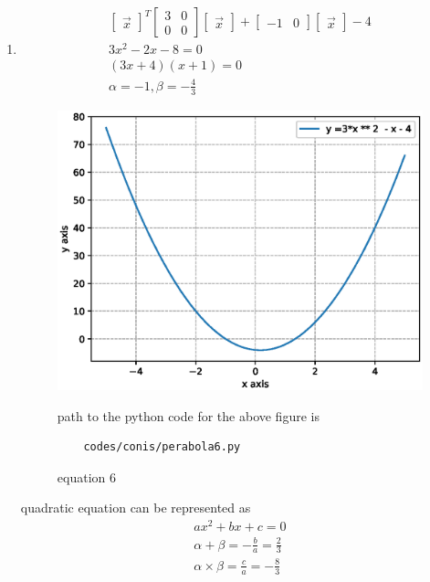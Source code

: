 \begin{enumerate}[label=\arabic*.,ref=\thesubsection.\theenumi]
\item
\begin{align}
\begin{bmatrix}\vec x\end{bmatrix}^T\begin{bmatrix}3 & 0\\0 & 0\end{bmatrix}\begin{bmatrix}\vec x\end{bmatrix} + \begin{bmatrix}-1 & 0\end{bmatrix}\begin{bmatrix}\vec x\end{bmatrix} -4
\\
3x^2-2x-8 = 0
\\
\left(3x + 4\right)\left(x + 1\right) = 0
\\
\alpha = -1,\beta =-\frac{4}{3}
\end{align}

\begin{figure}[!ht]
	\centering
	\includegraphics[width=\columnwidth]{./figures/conics/perabola6.eps}
	\caption{equation 6 }
	\label{fig:perabola6}
	path to the python code for the above figure is 
	\begin{lstlisting}
	codes/conis/perabola6.py
	\end{lstlisting}
\end{figure}

quadratic equation can be represented as 
\begin{align}
ax^2+bx +c = 0
\\
\alpha +\beta = -\frac{b}{a} = \frac{2}{3}
\\
\alpha \times \beta = \frac{c}{a} = -\frac{8}{3}
\end{align}

\end{enumerate}